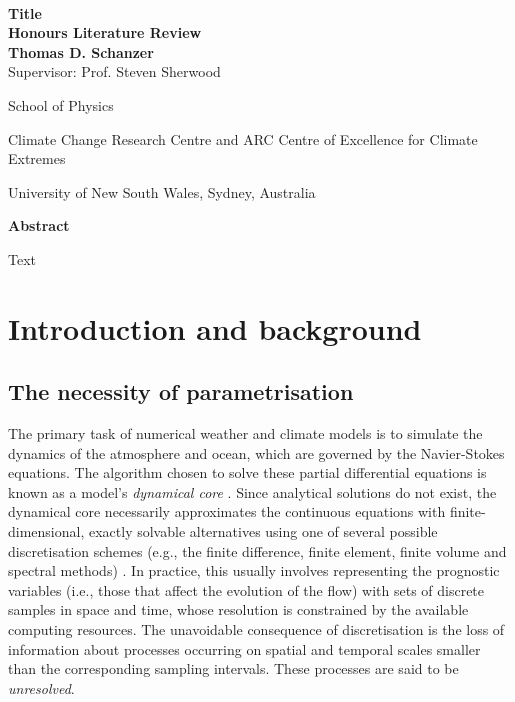 \documentclass[titlepage]{article}
\numberwithin{equation}{section}
\begin{document}
\begin{titlepage}
\vfill~

\begin{center}
    {\Huge \textbf{%
        Title
    }} \\
    \vspace{0.75cm}
    {\Large\textbf{Honours Literature Review}} \\
    \vspace{0.75cm}
    {\Large\textbf{Thomas D. Schanzer}} \\
    \vspace{6pt}
    {\large Supervisor: Prof. Steven Sherwood} \\
    \vspace{0.75cm}
    {\large%
        School of Physics

        Climate Change Research Centre and
        ARC Centre of Excellence for Climate Extremes

        University of New South Wales, Sydney, Australia
    }
\end{center}
\vfill
\begin{center}
{\large\textbf{Abstract}}

\begin{minipage}{13cm}
    Text
\end{minipage}
\end{center}
\vfill
\end{titlepage}

\newpage
\tableofcontents

\newpage
\pagestyle{fancy}
\thispagestyle{fancy}

\section{Introduction and background}
\subsection{The necessity of parametrisation}
The primary task of numerical weather and climate models is to simulate the
dynamics of the atmosphere and ocean, which are governed by the Navier-Stokes
equations. The algorithm chosen to solve these partial differential equations
is known as a model's \emph{dynamical core} \parencite{mcfarlane2011}. Since
analytical solutions do not exist, the dynamical core necessarily approximates
the continuous equations with finite-dimensional, exactly solvable alternatives
using one of several possible discretisation schemes (e.g., the finite
difference, finite element, finite volume and spectral methods)
\parencite{christensen2022}. In practice, this usually involves representing
the prognostic variables (i.e., those that affect the evolution of the flow)
with sets of discrete samples in space and time, whose resolution is
constrained by the available computing resources. The unavoidable consequence
of discretisation is the loss of information about processes occurring on
spatial and temporal scales smaller than the corresponding sampling intervals.
These processes are said to be \emph{unresolved}.
\end{document}
